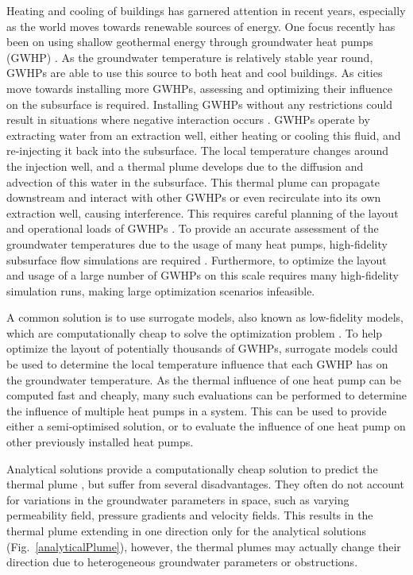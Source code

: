 \documentclass{article} %
\begin{document}
Heating and cooling of buildings has garnered attention in recent years, especially as the world moves towards renewable sources of energy. 
One focus recently has been on using shallow geothermal energy through groundwater heat pumps (GWHP) \citep{Halilovic2022}. 
As the groundwater temperature is relatively stable year round, GWHPs are able to use this source to both heat and cool buildings. %
As cities move towards installing more GWHPs, assessing and optimizing their influence on the subsurface is required. 
Installing GWHPs without any restrictions could result in situations where negative interaction occurs \citep{Garcia2020, Daemi2019}. 
GWHPs operate by extracting water from an extraction well, either heating or cooling this fluid, and re-injecting it back into the subsurface.  
The local temperature changes around the injection well, and a thermal plume develops due to the diffusion and advection of this water in the subsurface. 
This thermal plume can propagate downstream and interact with other GWHPs or even recirculate into its own extraction well, causing interference. 
This requires careful planning of the layout and operational loads of GWHPs \citep{Beck2013}. 
To provide an accurate assessment of the groundwater temperatures due to the usage of many heat pumps, high-fidelity subsurface flow simulations are required \citep{Meng2019}. 
Furthermore, to optimize the layout and usage of a large number of GWHPs on this scale requires many high-fidelity simulation runs, making large optimization scenarios infeasible.

A common solution is to use surrogate models, also known as low-fidelity models, which are computationally cheap to solve the optimization problem \citep{Sbai2019, Nagoor2019, Robinson2012}. 
To help optimize the layout of potentially thousands of GWHPs, surrogate models could be used to determine the local temperature influence that each GWHP has on the groundwater temperature. 
As the thermal influence of one heat pump can be computed fast and cheaply, many such evaluations can be performed to determine the influence of multiple heat pumps in a system. 
This can be used to provide either a semi-optimised solution, or to evaluate the influence of one heat pump on other previously installed heat pumps. 

Analytical solutions provide a computationally cheap solution to predict the thermal plume \citep{Pophillat2020}, but suffer from several disadvantages. 
They often do not account for variations in the groundwater parameters in space, such as varying permeability field, pressure gradients and velocity fields. 
This results in the thermal plume extending in one direction only for the analytical solutions (Fig.~\ref{analyticalPlume}), however, the thermal plumes may actually change their direction due to heterogeneous groundwater parameters or obstructions. 
\end{document}
